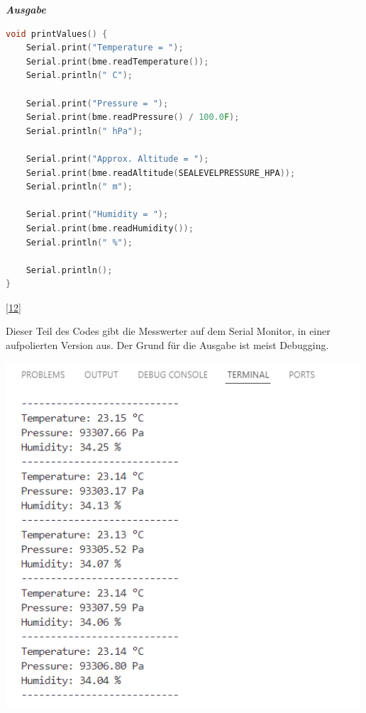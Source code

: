 \documentclass[
    headings=optiontotocandhead,%
    twoside,
    numbers=noenddot,%
    12pt, %
    titlepage, %
    parskip=full, %
    listof=leveldown, 
    numbers=noenddot, %
    a4paper,DIV=14,
    BCOR=15mm,
]{scrbook}
\let\origfigure=\figure
\let\endorigfigure=\endfigure
\renewenvironment{figure}[1][]{%
   \origfigure[H]
}{%
   \endorigfigure
}
\begin{document}
\textbf{\emph{Ausgabe}}

\begin{lstlisting}[language={C++}, caption={Ausgabe BME}]
void printValues() {
    Serial.print("Temperature = ");
    Serial.print(bme.readTemperature());
    Serial.println(" C");

    Serial.print("Pressure = ");
    Serial.print(bme.readPressure() / 100.0F);
    Serial.println(" hPa");

    Serial.print("Approx. Altitude = ");
    Serial.print(bme.readAltitude(SEALEVELPRESSURE_HPA));
    Serial.println(" m");

    Serial.print("Humidity = ");
    Serial.print(bme.readHumidity());
    Serial.println(" %");

    Serial.println();
}
\end{lstlisting}

{[}\protect\hyperlink{ref-BME280-Test}{12}{]}

Dieser Teil des Codes gibt die Messwerter auf dem Serial Monitor, in
einer aufpolierten Version aus. Der Grund für die Ausgabe ist meist
Debugging.

\begin{figure}
\centering
\includegraphics[width=5.20833in,height=\textheight]{img/Kampl/BME-Terminal.png}
\caption{BME-Ausgabe}
\end{figure}
\end{document}
